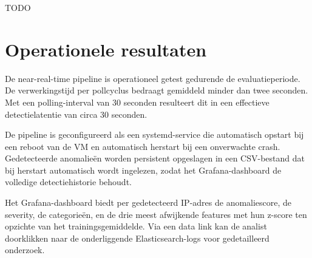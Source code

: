 TODO
 
 
 
 
 
\section{Operationele resultaten}
\label{sec:operationele-resultaten}
 
De near-real-time pipeline is operationeel getest gedurende de evaluatieperiode. De verwerkingstijd per pollcyclus bedraagt gemiddeld minder dan twee seconden. Met een polling-interval van 30 seconden resulteert dit in een effectieve detectielatentie van circa 30 seconden.
 
De pipeline is geconfigureerd als een systemd-service die automatisch opstart bij een reboot van de VM en automatisch herstart bij een onverwachte crash. Gedetecteerde anomalieën worden persistent opgeslagen in een CSV-bestand dat bij herstart automatisch wordt ingelezen, zodat het Grafana-dashboard de volledige detectiehistorie behoudt.
 
Het Grafana-dashboard biedt per gedetecteerd IP-adres de anomaliescore, de severity, de categorieën, en de drie meest afwijkende features met hun z-score ten opzichte van het trainingsgemiddelde. Via een data link kan de analist doorklikken naar de onderliggende Elasticsearch-logs voor gedetailleerd onderzoek.
 
